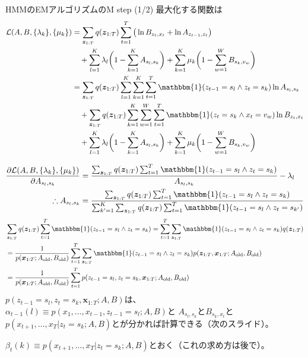 \documentclass[aspectratio=169,unicode,dvipdfmx,14pt]{beamer}
\begin{document}
\begin{frame}{HMMのEMアルゴリズムのM step (1/2)}
\FontMath
最大化する関数は
\begin{align}
\mathcal{L}(A, B, \{ \lambda_k \} , \{ \mu_k \})
& 
= \sum_{\bm{z}_{1:T}} q(\bm{z}_{1:T}) \sum_{t=1}^T \big( \ln B_{z_t,x_t} + \ln A_{z_{t-1},z_t} \big)
\notag \\ & \mbox{ \ \ }
+ \sum_{l=1}^K \lambda_l \bigg( 1 - \sum_{k=1}^K A_{s_l, s_k} \bigg)
+ \sum_{k=1}^K \mu_k \bigg( 1 - \sum_{w=1}^W B_{s_k, v_w} \bigg)
\notag \\ &
= 
\sum_{\bm{z}_{1:T}} q(\bm{z}_{1:T}) \sum_{l=1}^K \sum_{k=1}^K \sum_{t=1}^T 
\mathbbm{1}( z_{t-1} = s_l \wedge z_t = s_k ) \ln A_{s_l, s_k}
\notag \\ & \mbox{ \ \ }
+ \sum_{\bm{z}_{1:T}} q(\bm{z}_{1:T}) \sum_{k=1}^K \sum_{w=1}^W \sum_{t=1}^T 
\mathbbm{1}( z_t = s_k \wedge x_t = v_w ) \ln B_{z_t,x_t}
\notag \\ & \mbox{ \ \ }
+ \sum_{l=1}^K \lambda_l \bigg( 1 - \sum_{k=1}^K A_{s_l, s_k} \bigg)
+ \sum_{k=1}^K \mu_k \bigg( 1 - \sum_{w=1}^W B_{s_k, v_w} \bigg)
\end{align}
\end{frame}


\begin{frame}
\FontMath
\begin{align}
\frac{\partial \mathcal{L}(A, B, \{ \lambda_k \} , \{ \mu_k \}) }{\partial A_{s_l, s_k}}
& = \frac{ \sum_{\bm{z}_{1:T}} q(\bm{z}_{1:T}) \sum_{t=1}^T 
\mathbbm{1}( z_{t-1} = s_l \wedge z_t = s_k ) }{A_{s_l, s_k}}
- \lambda_l
\\
\therefore A_{s_l, s_k} & = \frac{ \sum_{\bm{z}_{1:T}} q(\bm{z}_{1:T}) \sum_{t=1}^T 
\mathbbm{1}( z_{t-1} = s_l \wedge z_t = s_k ) }
{ \sum_{k^\prime=1}^K \sum_{\bm{z}_{1:T}} q(\bm{z}_{1:T}) \sum_{t=1}^T \mathbbm{1}( z_{t-1} = s_l \wedge z_t = s_{k^\prime} ) }
\end{align}
\begin{align}
& \sum_{\bm{z}_{1:T}} q(\bm{z}_{1:T}) \sum_{t=1}^T 
\mathbbm{1}( z_{t-1} = s_l \wedge z_t = s_k )
=
\sum_{t=1}^T \sum_{\bm{z}_{1:T}}  
\mathbbm{1}( z_{t-1} = s_l \wedge z_t = s_k )q(\bm{z}_{1:T})
\notag \\ &
= 
\frac{1}{p(\bm{x}_{1:T}; A_{\mbox{\scriptsize old}}, B_{\mbox{\scriptsize old}})}
\sum_{t=1}^T \sum_{\bm{z}_{1:T}}  
\mathbbm{1}( z_{t-1} = s_l \wedge z_t = s_k ) 
p(\bm{z}_{1:T} , \bm{x}_{1:T}; A_{\mbox{\scriptsize old}}, B_{\mbox{\scriptsize old}})
\notag \\ &
= 
\frac{1}{p(\bm{x}_{1:T}; A_{\mbox{\scriptsize old}}, B_{\mbox{\scriptsize old}})}
\sum_{t=1}^T p(z_{t-1}=s_l, z_t=s_k, \bm{x}_{1:T}; A_{\mbox{\scriptsize old}}, B_{\mbox{\scriptsize old}})
\end{align}
$p(z_{t-1}=s_l, z_t=s_k, \bm{x}_{1:T}; A, B)$は、
$\alpha_{t-1}(l) \equiv p(x_1,\ldots, x_{t-1}, z_{t-1}=s_l; A, B)$と
$A_{s_l,s_k}$と$B_{s_k,x_t}$と
$p(x_{t+1},\ldots,x_T|z_t=s_k;A,B)$とが分かれば計算できる（次のスライド）。

$\beta_t(k) \equiv p(x_{t+1},\ldots,x_T|z_t=s_k;A,B)$とおく（これの求め方は後で）。
\end{frame}
\end{document}
